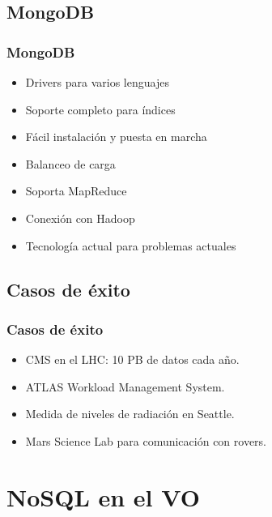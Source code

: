 \documentclass[serif,12pt]{beamer}
\begin{document}
\subsection{MongoDB}
\begin{frame}
\frametitle{MongoDB}

\begin{itemize}
\item Drivers para varios lenguajes
\item Soporte completo para índices
\item Fácil instalación y puesta en marcha
\item Balanceo de carga
\item Soporta MapReduce
\item Conexión con Hadoop
\item Tecnología actual para problemas actuales
\end{itemize}

\end{frame}

\subsection{Casos de éxito}
\begin{frame}
\frametitle{Casos de éxito}

\begin{itemize}
\item CMS en el LHC: 10 PB de datos cada año.
\item ATLAS Workload Management System.
\item Medida de niveles de radiación en Seattle.
\item Mars Science Lab para comunicación con rovers.
\end{itemize}


\end{frame}





\section{NoSQL en el VO}
\end{document}
